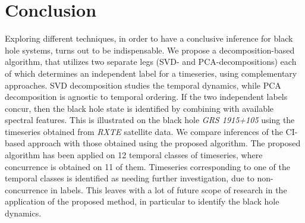 \documentclass[journal]{IEEEtran}
\begin{document}
	\section{Conclusion}
	Exploring different techniques, in order to have a conclusive inference for black hole systems, turns out to be indispensable. We propose a decomposition-based algorithm, that utilizes two separate legs (SVD- and PCA-decompositions) each of which determines an independent label for a timeseries, using complementary approaches. SVD decomposition studies the temporal dynamics, while PCA decomposition is agnostic to temporal ordering. If the two independent labels concur, then the black hole state is identified by combining with available spectral features. This is illustrated on the black hole \textit{GRS 1915+105} using the timeseries obtained from \textit{RXTE} satellite data. We compare inferences of the CI-based approach with those obtained using the proposed algorithm. The proposed algorithm has been applied on 12 temporal classes of timeseries, where concurrence is obtained on 11 of them. Timeseries corresponding to one of the temporal classes is identified as needing further investigation, due to non-concurrence in labels. This leaves with a lot of future scope of research in the application of the proposed method, in particular to identify the black hole dynamics.
	
	
\end{document}
